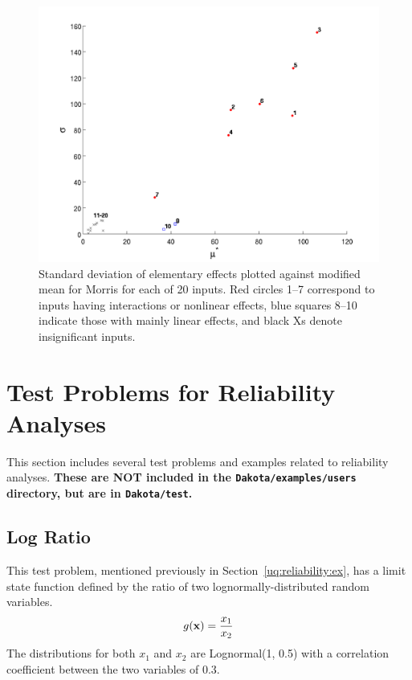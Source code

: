 \begin{figure}[ht!]
\centering
\includegraphics[width=\textwidth]{images/moat_mustar_sigma}
\caption{\label{FIG:mustar_sigma} Standard deviation of elementary
effects plotted against modified mean for Morris for each of 20
inputs. Red circles 1--7 correspond to inputs having interactions or
nonlinear effects, blue squares 8--10 indicate those with mainly
linear effects, and black Xs denote insignificant inputs.}
\end{figure}

\clearpage
\section{Test Problems for Reliability Analyses}\label{additional:reliabilityproblems}
This section includes several test problems and examples related to 
reliability analyses. {\bf These are NOT included in the {\tt Dakota/examples/users} 
directory, but are in {\tt Dakota/test}.}


\subsection{Log Ratio}\label{additional:logratio}

This test problem, mentioned previously in
Section~\ref{uq:reliability:ex}, has a limit state function defined by
the ratio of two lognormally-distributed random variables.
\begin{equation}
g({\bf x}) = \frac{x_1}{x_2}
\end{equation}
The distributions for both $x_1$ and $x_2$ are Lognormal(1, 0.5) with
a correlation coefficient between the two variables of 0.3.

